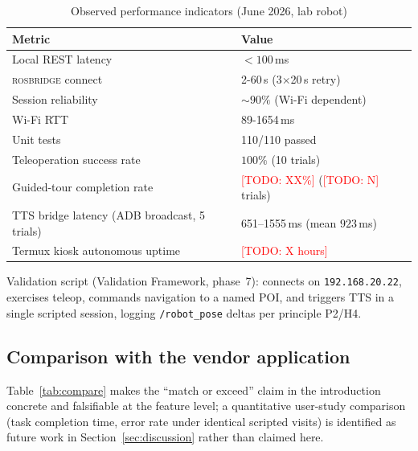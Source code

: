 \documentclass[conference]{IEEEtran}
\newcommand{\rosbridge}{\textsc{rosbridge}}
\newcommand{\ph}[1]{\textcolor{red}{[TODO: #1]}}
\begin{document}
\begin{table}[!t]
\caption{Observed performance indicators (June 2026, lab robot)}
\label{tab:metrics}
\centering
\scriptsize
\begin{tabular}{@{}ll@{}}
\toprule
\textbf{Metric} & \textbf{Value} \\
\midrule
Local REST latency & ${<}100$\,ms \\
\rosbridge{} connect & 2-60\,s (3$\times$20\,s retry) \\
Session reliability & ${\sim}90\%$ (Wi-Fi dependent) \\
Wi-Fi RTT & 89-1654\,ms \\
Unit tests & 110/110 passed \\
Teleoperation success rate & $100\%$ (10 trials) \\
Guided-tour completion rate & \ph{XX\%} (\ph{N} trials) \\
TTS bridge latency (ADB broadcast, 5 trials) & 651--1555\,ms (mean $923$\,ms) \\
Termux kiosk autonomous uptime & \ph{X hours} \\
\bottomrule
\end{tabular}
\end{table}

Validation script (Validation Framework, phase~7): connects on \texttt{192.168.20.22}, exercises teleop, commands navigation to a named POI, and triggers TTS in a single scripted session, logging \texttt{/robot\_pose} deltas per principle P2/H4.

\subsection{Comparison with the vendor application}
\label{sec:comparison}

Table~\ref{tab:compare} makes the ``match or exceed'' claim in the introduction concrete and falsifiable at the feature level; a quantitative user-study comparison (task completion time, error rate under identical scripted visits) is identified as future work in Section~\ref{sec:discussion} rather than claimed here.
\end{document}
